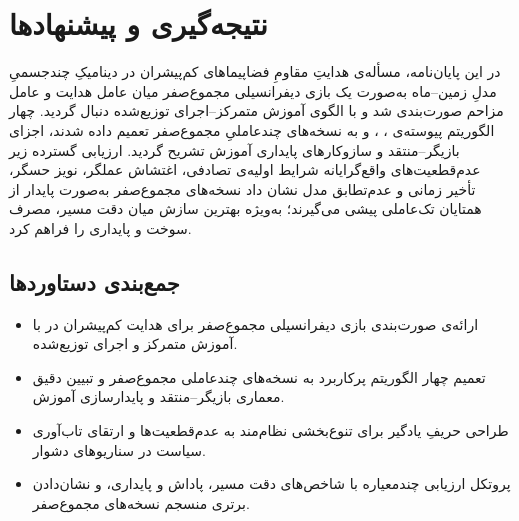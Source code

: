 
\chapter{نتیجه‌گیری و پیشنهادها}
\label{chap:conclusion}

\noindent
در این پایان‌نامه، مسأله‌ی هدایتِ مقاومِ فضاپیماهای کم‌پیشران در دینامیکِ چندجسمیِ مدلِ  زمین–ماه به‌صورت یک {بازی دیفرانسیلی مجموع‌صفر} میان عامل هدایت و عامل مزاحم صورت‌بندی شد و با الگوی {آموزش متمرکز–اجرای توزیع‌شده} دنبال گردید. چهار الگوریتم پیوسته‌ی ، ،  و  به نسخه‌های چندعاملیِ مجموع‌صفر تعمیم داده شدند، اجزای بازیگر–منتقد و سازوکارهای پایداری آموزش تشریح گردید. ارزیابی گسترده زیر عدم‌قطعیت‌های واقع‌گرایانه شرایط اولیه‌ی تصادفی، اغتشاش عملگر، نویز حسگر، تأخیر زمانی و عدم‌تطابق مدل نشان داد نسخه‌های مجموع‌صفر به‌صورت پایدار از همتایان تک‌عاملی پیشی می‌گیرند؛ به‌ویژه  بهترین سازش میان دقت مسیر، مصرف سوخت و پایداری را فراهم کرد.

\section*{جمع‌بندی دستاوردها}
\begin{itemize}
  \item ارائه‌ی صورت‌بندی بازی دیفرانسیلی مجموع‌صفر برای هدایت کم‌پیشران در  با آموزش متمرکز و اجرای توزیع‌شده.
  \item تعمیم چهار الگوریتم پرکاربرد  به نسخه‌های چندعاملی مجموع‌صفر و تبیین دقیق معماری بازیگر–منتقد و پایدارسازی آموزش.
  \item طراحی حریفِ یادگیر برای تنوع‌بخشی نظام‌مند به عدم‌قطعیت‌ها و ارتقای تاب‌آوری سیاست در سناریوهای دشوار.
  \item پروتکل ارزیابی چندمعیاره با شاخص‌های دقت مسیر، پاداش 
  و پایداری، و نشان‌دادن برتری
   منسجم نسخه‌های مجموع‌صفر.
\end{itemize}


